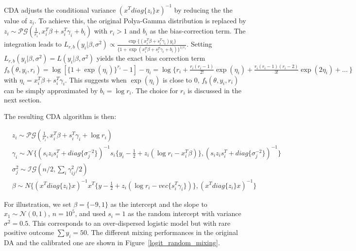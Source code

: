 \documentclass[10pt]{article}
\newcommand{\xbeta}{ x_i^T \beta}
\begin{document}
CDA adjusts the conditional variance $(x^T diag\{z_i\}x)^{-1} $ by reducing the the value of $z_i$. To achieve this, the original Polya-Gamma distribution is replaced by  $z_i\sim \mathcal{PG}(\frac{1}{r_i}, \xbeta+s_i^T\gamma_i + b_i)$ with $r_i>1$ and $b_i$ as the bias-correction term. The integration leads to $L_{r,b}(y_i|\beta, \sigma^2)\propto \frac{\exp\{ (\xbeta+s_i^T\gamma_i) y_i \} }{ \{ 1+ \exp(\xbeta+s_i^T\gamma_i +b_i) \}^{1/r_i} }$. Setting $L_{r,b}(y_i|\beta, \sigma^2)= L(y_i|\beta, \sigma^2)$ yields the exact bias correction term $f_b(\theta,y_i,r_i) =  \log [     \{ 1+\exp(\eta_i  ) \}^{r_i} -1    ] - \eta_i = \log\{ r_i + \frac{r_i(r_i-1)}{2!} \exp(\eta_i)+ \frac{r_i(r_i-1)(r_i-2)}{3!} \exp(2\eta_i) +\ldots \ \}$ with $\eta_i=\xbeta+s_i^T\gamma_i$. This suggests when $\exp(\eta_i)$ is close to $0$, $f_b(\theta,y_i,r_i) $ can be simply approximated by $b_i = \log r_i$. The choice for $r_i$ is discussed in the next section.

The resulting CDA algorithm is then:

\begin{equation}\begin{aligned}
		& z_i\sim \mathcal{PG}(\frac{1}{r_i}, \xbeta+s_i^T\gamma_i + \log r_i) \\
	& \gamma_i \sim \mathcal{N}\{  (s_i z_i s_i^T   + diag\{\sigma_j^{-2}\}  )^{-1}   s_i  \{ y_i-\frac{1}{2} + z_i (\log r_i- \xbeta) \}  ,  (s_i z_i s_i^T   + diag\{\sigma_j^{-2}\}  )^{-1}   \}\\
	& \sigma_j^{2}\sim \mathcal{IG}(n/2, \sum_i \gamma_{ij}^2/2)\\
	& \beta \sim N\{  (x^T diag\{z_i\}x)^{-1}   x^T  \{ y-\frac{1}{2} + z_i (\log r_i- vec \{ s_i^T\gamma_i \})\}  ,  (x^T diag\{z_i\}x)^{-1}   \}
\end{aligned}\end{equation}
	

For illustration, we set $\beta=\{-9,1\}$ as the intercept and the slope to $x_1\sim \mathcal{N}(0,1)$, $n= 10^5$, and used $s_i =1$ as the random intercept with variance $\sigma^2 = 0.5$. This corresponds to an over-dispersed logistic model but with rare positive outcome $\sum y_i = 50 $. The different mixing performances in the original DA and the calibrated one are shown in Figure~\ref{logit_random_mixing}.
\end{document}
